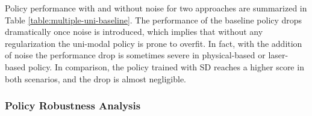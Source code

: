 \documentclass[../thesis.tex]{subfiles}
\begin{document}
Policy performance with and without noise for two approaches are summarized in Table \ref{table:multiple-uni-baseline}. 
The performance of the baseline policy drops dramatically once noise is introduced, which implies that without any regularization the uni-modal policy is prone to overfit. In fact, with the addition of noise the performance drop is sometimes severe in physical-based or laser-based policy. 
In comparison, the policy trained with SD reaches a higher score in both scenarios, and the drop is almost negligible.
 





\subsubsection{Policy Robustness Analysis}
\end{document}
